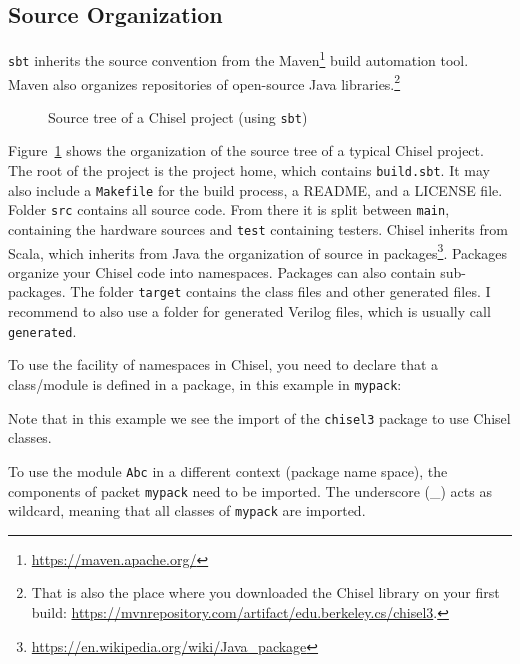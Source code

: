 \documentclass[%
    10pt,
    headinclude, footexclude,
    openright, %
    notitlepage,
    cleardoubleempty,
    headsepline,
    pointlessnumbers,
    bibtotoc, idxtotoc,
    ]{scrbook}
\newcommand{\code}[1]{{\small{\texttt{#1}}}}
\newcommand{\myref}[2]{\href{#1}{#2}}
\renewcommand{\myref}[2]{{#2}{\footnote{\url{#1}}}}
\begin{document}
\subsection{Source Organization}


\code{sbt} inherits the source convention from the \myref{https://maven.apache.org/}{Maven}
build automation tool. Maven also organizes repositories of open-source Java libraries.\footnote{That is
also the place where you downloaded the Chisel library on your first build:
\url{https://mvnrepository.com/artifact/edu.berkeley.cs/chisel3}.}

\begin{figure}
\caption{Source tree of a Chisel project (using \code{sbt})}
\label{fig:folders}
\end{figure}

Figure~\ref{fig:folders} shows the organization of the source tree of a typical Chisel project.
The root of the project is the project home, which contains \code{build.sbt}.
It may also include a \code{Makefile} for the build process, a README, and a LICENSE file.
Folder \code{src} contains all source code. From there it is split between \code{main},
containing the hardware sources and \code{test} containing testers.
Chisel inherits from Scala, which inherits from Java the organization of source
in \myref{https://en.wikipedia.org/wiki/Java_package}{packages}.
Packages organize your Chisel code into namespaces. Packages can also contain
sub-packages.
The folder \code{target} contains the class files and other generated files.
I recommend to also use a folder for generated Verilog files, which is usually
call \code{generated}.


To use the facility of namespaces in Chisel, you need to declare that a class/module
is defined in a package, in this example in \code{mypack}:


\noindent Note that in this example we see the import of the \code{chisel3} package
to use Chisel classes.

To use the module \code{Abc} in a different context (package name space),
the components of packet \code{mypack} need to be imported. The underscore
(\_) acts as wildcard, meaning that all classes of \code{mypack} are imported.
\end{document}
